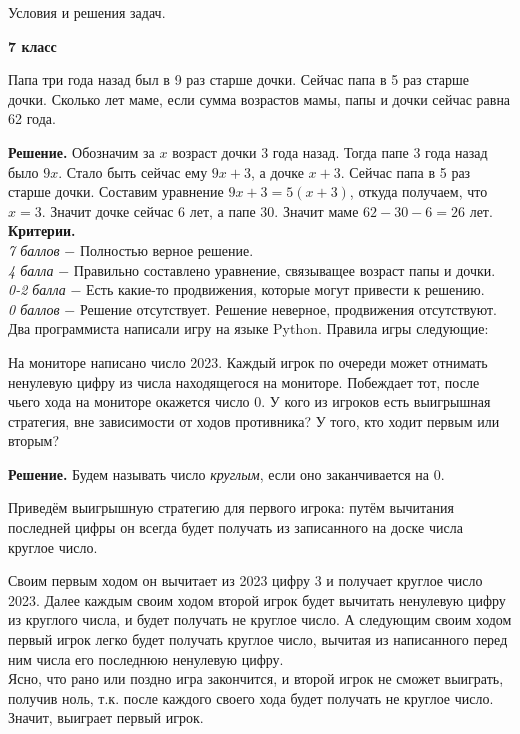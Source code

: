 

\centerline{\Huge Условия и решения задач.}
\centerline{\bf \Huge 7 класс}

 Папа три года назад был в 9 раз старше дочки. Сейчас папа в 5 раз старше дочки. Сколько лет маме, если сумма возрастов мамы, папы и дочки сейчас равна 62 года. \par

\textbf{Решение.} Обозначим за $x$ возраст дочки 3 года назад. Тогда папе 3 года назад было $9x$. Стало быть сейчас ему $9x+3$, а дочке $x+3$. Сейчас папа в 5 раз старше дочки. Составим уравнение $9x+3 = 5(x+3)$, откуда получаем, что $x = 3$. Значит дочке сейчас 6 лет, а папе 30. Значит маме $62-30-6=26$ лет. \\ 

\textbf{Критерии.} \\
\textit{7 баллов} $-$ Полностью верное решение. \\
\textit{4 балла} $-$ Правильно составлено уравнение, связыващее возраст папы и дочки. \\
\textit{0-2 балла} $-$ Есть какие-то продвижения, которые могут привести к решению. \\ 
\textit{0 баллов} $-$ Решение отсутствует. Решение неверное, продвижения отсутствуют. \\ 

  Два программиста написали игру на языке Python. Правила игры следующие:\par
На мониторе написано число 2023. Каждый игрок по очереди может отнимать ненулевую цифру из числа находящегося на мониторе. Побеждает тот, после чьего хода на мониторе окажется число 0. У кого из игроков есть выигрышная стратегия, вне зависимости от ходов противника? У того, кто ходит первым или вторым?  \par

\textbf{Решение.} Будем называть число \textit{круглым}, если оно заканчивается на 0. \par
Приведём выигрышную стратегию для первого игрока: путём вычитания последней цифры он всегда будет получать из записанного на доске числа круглое число. \par
Своим первым ходом он вычитает из 2023 цифру 3 и получает круглое число 2023. Далее каждым своим ходом второй игрок будет вычитать ненулевую цифру из круглого числа, и будет получать не круглое число. А следующим своим ходом первый игрок легко будет получать круглое число, вычитая из написанного перед ним числа его последнюю ненулевую цифру.\\
Ясно, что рано или поздно игра закончится, и второй игрок не сможет выиграть, получив ноль, т.к. после каждого своего хода будет получать не круглое число. Значит, выиграет первый игрок.\\
\\ 


